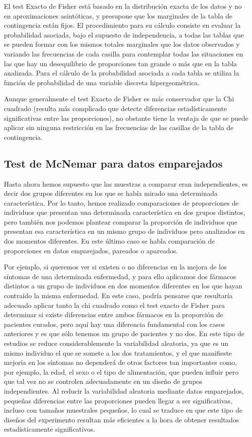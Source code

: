 El test Exacto de Fisher está basado en la distribución exacta de los datos y no en aproximaciones asintóticas, y presupone que los marginales de la tabla de contingencia están fijos. El procedimiento para su cálculo consiste en evaluar la probabilidad asociada, bajo el supuesto de independencia, a todas las tablas que se pueden formar con los mismos totales marginales que los datos observados y variando las frecuencias de cada casilla para contemplar todas las situaciones en las que hay un desequilibrio de proporciones tan grande o más que en la tabla analizada. Para el cálculo de la probabilidad asociada a cada tabla se utiliza la función de probabilidad de una variable discreta hipergeométrica.

Aunque generalmente el test Exacto de Fisher es más conservador que la Chi cuadrado (resulta más complicado que detecte diferencias estadísticamente significativas entre las proporciones), no obstante tiene la ventaja de que se puede aplicar sin ninguna restricción en las frecuencias de las casillas de la tabla de contingencia.


\subsection{Test de McNemar para datos emparejados}
Hasta ahora hemos supuesto que las muestras a comparar eran independientes, es decir dos grupos diferentes en los que se había mirado una
determinada característica. Por lo tanto, hemos realizado comparaciones de proporciones de individuos que presentan una determinada
característica en dos grupos distintos, pero también nos podemos plantear comparar la proporción de individuos que presentan esa
característica en un mismo grupo de individuos pero analizados en dos momentos diferentes. En este último caso se habla comparación de
proporciones en datos emparejados, pareados o apareados.

Por ejemplo, si queremos ver si existen o no diferencias en la mejora de los síntomas de una determinada enfermedad, y para ello aplicamos
dos fármacos distintos a un grupo de individuos en dos momentos diferentes en los que hayan contraído la misma enfermedad. En este caso,
podría pensarse que resultaría adecuado aplicar tanto la chi cuadrado como el test exacto de Fisher para determinar si existe diferencias
entre ambos fármacos en la proporción de pacientes curados, pero aquí hay una diferencia fundamental con los casos anteriores y es que sólo
tenemos un grupo de pacientes y no dos. En este tipo de estudios se reduce considerablemente la variabilidad aleatoria, ya que es un mismo
individuo el que se somete a los dos tratamientos, y el que manifieste mejoría en los síntomas no dependerá de otros factores tan
importantes como, por ejemplo, la edad, el sexo o el tipo de alimentación, que pueden influir pero que tal vez no se controlen adecuadamente
en un diseño de grupos independientes. Al reducir la variabilidad aleatoria mediante datos emparejados, pequeñas diferencias entre las
proporciones pueden llegar a ser significativas, incluso con tamaños muestrales pequeños, lo cual se traduce en que este tipo de diseños del
experimento resultan más eficientes a la hora de obtener resultados estadísticamente significativos.


